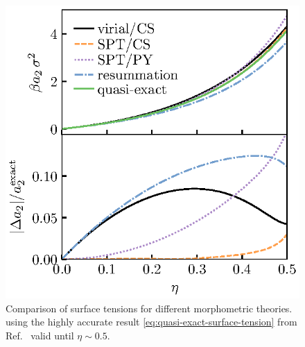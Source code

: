 \documentclass[11pt,twoside]{report}
\begin{document}
\begin{figure}
  \includegraphics[width=0.9\linewidth,outer]{resummation-a2}
  \caption[Accuracy of surface tension from exact morphological contribution]{
    Comparison of surface tensions for different morphometric theories.
  using the highly accurate result \eqref{eq:quasi-exact-surface-tension} from Ref.\ \cite{DavidchackMP2015} valid until $\eta \sim 0.5$.}
  \label{fig:resummation-a2}
\end{figure}



\end{document}
